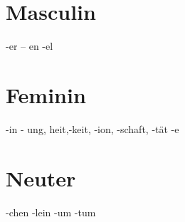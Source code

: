 \section{Masculin}
-er – en -el

\section*{Feminin}
-in
- ung, heit,-keit, -ion, -schaft, -tät
-e


\section{Neuter}
-chen -lein -um -tum


